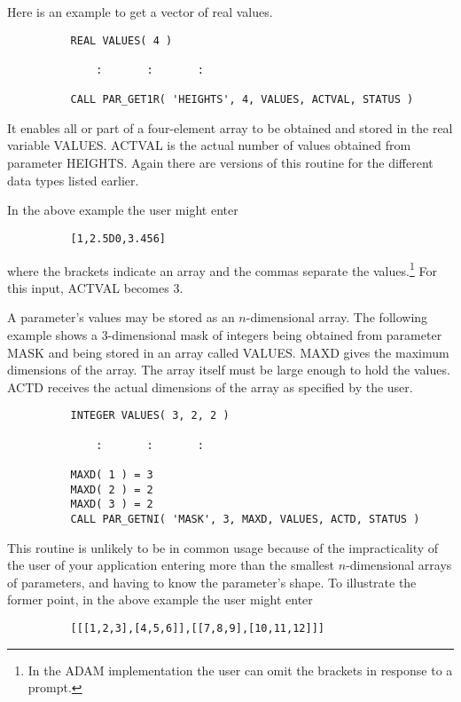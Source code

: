 \documentclass[twoside,11pt]{article}
\begin{document}
Here is an example to get a vector of real values.

\begin{verbatim}
          REAL VALUES( 4 )

              :       :       :

          CALL PAR_GET1R( 'HEIGHTS', 4, VALUES, ACTVAL, STATUS )
\end{verbatim}

It enables all or part of a four-element array to be obtained and
stored in the real variable VALUES.  ACTVAL is the actual number of
values obtained from parameter HEIGHTS.  Again there are versions of
this routine for the different data types listed earlier. 

In the above example the user might enter

\begin{verbatim}
          [1,2.5D0,3.456]
\end{verbatim}

where the brackets indicate an array and the commas
separate the values.\footnote{In the ADAM implementation the user can
omit the brackets in response to a prompt.}  For this input, ACTVAL 
becomes 3.  

A parameter's values may be stored as an $n$-dimensional array.
The following example shows a 3-dimensional mask of integers
being obtained from parameter MASK and being stored in an array called
VALUES.  MAXD gives the maximum dimensions of the array.  The array 
itself must be large enough to hold the values.  ACTD receives the
actual dimensions of the array as specified by the user.

\begin{verbatim}
          INTEGER VALUES( 3, 2, 2 )

              :       :       :

          MAXD( 1 ) = 3
          MAXD( 2 ) = 2
          MAXD( 3 ) = 2
          CALL PAR_GETNI( 'MASK', 3, MAXD, VALUES, ACTD, STATUS )
\end{verbatim}

This routine is unlikely to be in common usage because of the
impracticality of the user of your application entering more than the
smallest $n$-dimensional arrays of parameters, and having to know the
parameter's shape.  To illustrate the former point, in the above
example the user might enter 
\begin{verbatim}
          [[[1,2,3],[4,5,6]],[[7,8,9],[10,11,12]]]
\end{verbatim}
\end{document}
